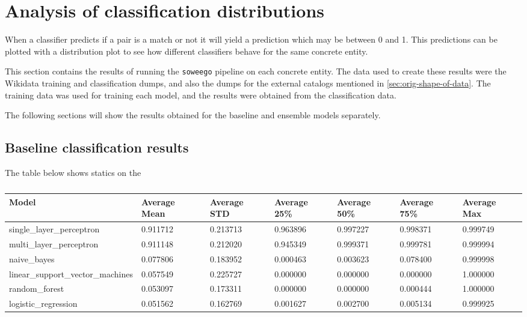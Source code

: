 \documentclass[epsfig,a4paper,11pt,titlepage,twoside,openany]{book}
\begin{document}
\section{Analysis of classification distributions}
\label{sec:apx-classification-results}



When a classifier predicts if a pair is a match or not it will yield a prediction which may be between 0 and 1. This predictions can be plotted with a distribution plot to see how different classifiers behave for the same concrete entity.

This section contains the results of running the \texttt{soweego} pipeline on each concrete entity. The data used to create these results were the Wikidata training and classification dumps, and also the dumps for the external catalogs mentioned in \autoref{sec:orig-shape-of-data}. The training data was used for training each model, and the results were obtained from the classification data.

The following sections will show the results obtained for the baseline and ensemble models separately.

\subsection{Baseline classification results}
\label{sec:apx-baseline-classification-results}

The table below shows statics on the 

\begin{table}[H]
\centering
\begin{tabular}{|l|l|l|l|ll|l|}
\hline
Model                             & Average Mean & Average STD & Average 25\% & Average 50\% & Average 75\% & Average Max \\ \hline
single\_layer\_perceptron         & 0.911712     & 0.213713    & 0.963896     & 0.997227     & 0.998371     & 0.999749    \\
multi\_layer\_perceptron          & 0.911148     & 0.212020    & 0.945349     & 0.999371     & 0.999781     & 0.999994    \\
naive\_bayes                      & 0.077806     & 0.183952    & 0.000463     & 0.003623     & 0.078400     & 0.999998    \\
linear\_support\_vector\_machines & 0.057549     & 0.225727    & 0.000000     & 0.000000     & 0.000000     & 1.000000    \\
random\_forest                    & 0.053097     & 0.173311    & 0.000000     & 0.000000     & 0.000444     & 1.000000    \\
logistic\_regression              & 0.051562     & 0.162769    & 0.001627     & 0.002700     & 0.005134     & 0.999925    \\ \hline
\end{tabular}
\caption{}
\label{tab:my-table}
\end{table}
\end{document}
